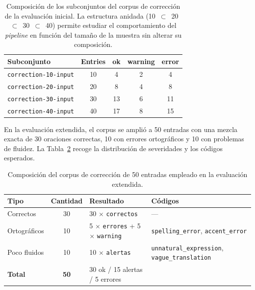 \begin{table}[ht]
	\centering
	\small
	\begin{tabular}{lcccc}
		\hline
		\textbf{Subconjunto}         & \textbf{Entries} & \textbf{ok} & \textbf{warning} & \textbf{error} \\
		\hline
		\texttt{correction-10-input} & 10               & 4           & 2                & 4              \\
		\texttt{correction-20-input} & 20               & 8           & 4                & 8              \\
		\texttt{correction-30-input} & 30               & 13          & 6                & 11             \\
		\texttt{correction-40-input} & 40               & 17          & 8                & 15             \\
		\hline
	\end{tabular}
	\caption{Composición de los subconjuntos del corpus de corrección de la
		evaluación inicial. La estructura anidada (10~$\subset$~20~$\subset$~30~$\subset$~40)
		permite estudiar el comportamiento del \textit{pipeline} en función del
		tamaño de la muestra sin alterar su composición.}
	\label{tab:corpus-correccion}
\end{table}

En la evaluación extendida, el corpus se amplió a 50 entradas con una mezcla
exacta de 30 oraciones correctas, 10 con errores ortográficos y 10 con
problemas de fluidez. La Tabla~\ref{tab:corpus-50-correccion} recoge la
distribución de severidades y los códigos esperados.

\begin{table}[ht]
	\centering
	\small
	\begin{tabular}{lcll}
		\hline
		\textbf{Tipo}  & \textbf{Cantidad} & \textbf{Resultado}                             & \textbf{Códigos}                                            \\
		\hline
		Correctos      & 30              & 30 $\times$ \texttt{correctos}                                 & ---                                                         \\
		Ortográficos   & 10              & 5 $\times$ \texttt{errores} + 5 $\times$ \texttt{warning} & \texttt{spelling\_error}, \texttt{accent\_error}            \\
		Poco fluidos   & 10              & 10 $\times$ \texttt{alertas}                            & \texttt{unnatural\_expression}, \texttt{vague\_translation} \\
		\hline
		\textbf{Total} & \textbf{50}     & 30 ok / 15 alertas / 5 errores                            &                                                             \\
		\hline
	\end{tabular}
	\caption{Composición del corpus de corrección de 50 entradas empleado en la
		evaluación extendida.}
	\label{tab:corpus-50-correccion}
\end{table}


